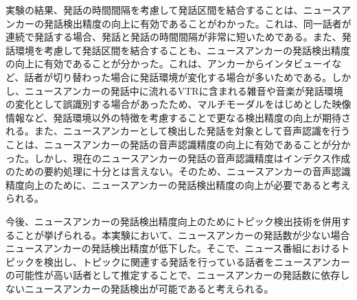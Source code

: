 実験の結果、発話の時間間隔を考慮して発話区間を結合することは、ニュースアンカーの発話検出精度の向上に有効であることがわかった。これは、同一話者が連続で発話する場合、発話と発話の時間間隔が非常に短いためである。また、発話環境を考慮して発話区間を結合することも、ニュースアンカーの発話検出精度の向上に有効であることが分かった。これは、アンカーからインタビューイなど、話者が切り替わった場合に発話環境が変化する場合が多いためである。しかし、ニュースアンカーの発話中に流れるVTRに含まれる雑音や音楽が発話環境の変化として誤識別する場合があったため、マルチモーダルをはじめとした映像情報など、発話環境以外の特徴を考慮することで更なる検出精度の向上が期待される。また、ニュースアンカーとして検出した発話を対象として音声認識を行うことは、ニュースアンカーの発話の音声認識精度の向上に有効であることが分かった。しかし、現在のニュースアンカーの発話の音声認識精度はインデクス作成のための要約処理に十分とは言えない。そのため、ニュースアンカーの音声認識精度向上のために、ニュースアンカーの発話検出精度の向上が必要であると考えられる。

今後、ニュースアンカーの発話検出精度向上のためにトピック検出技術を併用することが挙げられる。本実験において、ニュースアンカーの発話数が少ない場合ニュースアンカーの発話検出精度が低下した。そこで、ニュース番組におけるトピックを検出し、トピックに関連する発話を行っている話者をニュースアンカーの可能性が高い話者として推定することで、ニュースアンカーの発話数に依存しないニュースアンカーの発話検出が可能であると考えられる。\par
\begin{comment}
また、ニュース番組のインデクシングを実現するためにはニュースアンカーの発話の検出以外に、アンカーの発話内容を推定する必要がある。現在、「発話区間」「発話者」「発話内容」の全てが未知であるとき、ニュースアンカーの発話の音声認識精度はインデックスの作成に十分とは言えない。特に、ニュースアンカーの発話の音声認識精度が低下した理由として、ニュース番組内のVTRの存在がある。本研究で用いた音声認識システムでは雑音や音楽が同時に収録されていた場合、音声認識精度が極端に低下したため、ニュース番組音声から雑音除去を行う、雑音や音楽に頑健な音声認識システムを構築するなどを行う必要があると考えられる。
\end{comment}

\begin{comment}
ニュースアンカーの発話数によって発話の検出精度が低下した理由として、本研究で用いたニュースアンカーの発話検出手法がニュース番組内において、ニュースアンカーの発話が非常に多いことに着目した手法であるためである。このため、発話の少ないニュースアンカーの発話を十分に検出できず、検出精度が低下したと考えられる。\par
\end{comment}


